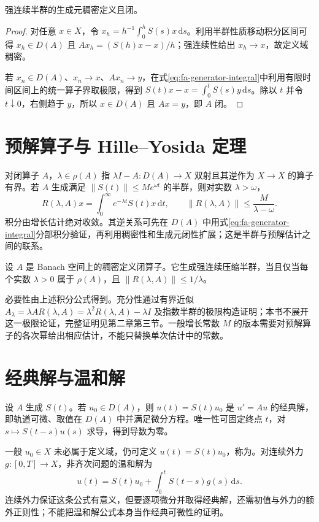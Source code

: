 \documentclass[UTF8,12pt,a4paper,fontset=fandol]{ctexbook}
\begin{document}
\begin{proposition}
强连续半群的生成元稠密定义且闭。
\end{proposition}
\begin{proof}
对任意 $x\in X$，令 $x_h=h^{-1}\int_0^hS(s)x\,\mathrm ds$。利用半群性质移动积分区间可得 $x_h\in D(A)$ 且 $Ax_h=(S(h)x-x)/h$；强连续性给出 $x_h\to x$，故定义域稠密。

若 $x_n\in D(A)$、$x_n\to x$、$Ax_n\to y$，在式\eqref{eq:fa-generator-integral}中利用有限时间区间上的统一算子界取极限，得到 $S(t)x-x=\int_0^tS(s)y\,\mathrm ds$。除以 $t$ 并令 $t\downarrow0$，右侧趋于 $y$，所以 $x\in D(A)$ 且 $Ax=y$，即 $A$ 闭。
\end{proof}

\section{预解算子与 Hille--Yosida 定理}
对闭算子 $A$，$\lambda\in\rho(A)$ 指 $\lambda I-A:D(A)\to X$ 双射且其逆作为 $X\to X$ 的算子有界。若 $A$ 生成满足 $\|S(t)\|\leq Me^{\omega t}$ 的半群，则对实数 $\lambda>\omega$，
\[
 R(\lambda,A)x=\int_0^\infty e^{-\lambda t}S(t)x\,\mathrm dt,
 \qquad\|R(\lambda,A)\|\leq\frac M{\lambda-\omega}.
\]
积分由增长估计绝对收敛。其逆关系可先在 $D(A)$ 中用式\eqref{eq:fa-generator-integral}分部积分验证，再利用稠密性和生成元闭性扩展；这是半群与预解估计之间的联系。

\begin{theorem}
设 $A$ 是 Banach 空间上的稠密定义闭算子。它生成强连续压缩半群，当且仅当每个实数 $\lambda>0$ 属于 $\rho(A)$，且 $\|R(\lambda,A)\|\leq1/\lambda$。
\end{theorem}
必要性由上述积分公式得到。充分性通过有界近似 $A_\lambda=\lambda A R(\lambda,A)=\lambda^2R(\lambda,A)-\lambda I$ 及指数半群的极限构造证明；本书不展开这一极限论证，完整证明见\cite{engel-nagel}第二章第三节。一般增长常数 $M$ 的版本需要对预解算子的各次幂给出相应估计，不能只替换单次估计中的常数。

\section{经典解与温和解}
设 $A$ 生成 $S(t)$。若 $u_0\in D(A)$，则 $u(t)=S(t)u_0$ 是 $u'=Au$ 的经典解，即轨道可微、取值在 $D(A)$ 中并满足微分方程。唯一性可固定终点 $t$，对 $s\mapsto S(t-s)u(s)$ 求导，得到导数为零。

一般 $u_0\in X$ 未必属于定义域，仍可定义 $u(t)=S(t)u_0$，称为。对连续外力 $g:[0,T]\to X$，非齐次问题的温和解为
\[
 u(t)=S(t)u_0+\int_0^tS(t-s)g(s)\,\mathrm ds.
\]
连续外力保证这条公式有意义，但要逐项微分并取得经典解，还需初值与外力的额外正则性；不能把温和解公式本身当作经典可微性的证明。
\end{document}
